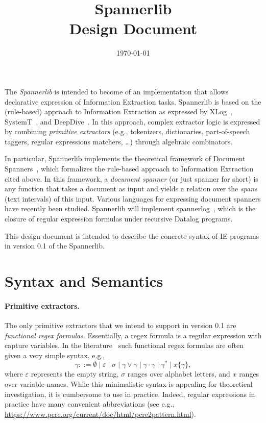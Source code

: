 \documentclass[a4paper,11pt,pdftex]{article}
\newcommand{\implname}{Spannerlib\xspace}
\newcommand{\ie}{IE\xspace}
\begin{document}
\title{\implname\\Design Document}
\date{\today}

\maketitle

The \emph{\implname} is intended to become of an implementation that allows
declarative expression of Information Extraction tasks. \implname is based on
the (rule-based) approach to Information Extraction as expressed by
XLog~\cite{SDNR07}, SystemT~\cite{CKLRRV10}, and DeepDive~\cite{DBLP:journals/cacm/ZhangRCSWW17}. In this approach, complex extractor logic is expressed by combining \emph{primitive extractors} (e.g., tokenizers, dictionaries, part-of-speech taggers, regular expressions matchers, \dots) through algebraic combinators.

In particular, \implname implements the theoretical framework of Document
Spanners~\cite{FaginKRV15}, which formalizes the rule-based approach to Information
Extraction cited above. In this framework, a \emph{document spanner} (or just
spanner for short) is any function that takes a document as input and yields a
relation over the \emph{spans} (text intervals) of this input.  Various
languages for expressing document spanners have recently been studied. \implname
will implement \textsf{spannerlog}~\cite{DBLP:conf/icdt/PeterfreundCFK19}, which is the closure of  regular expression formulas under recursive Datalog programs.

This design document is intended to describe the concrete syntax of \ie programs in version 0.1 of the \implname. 

\section{Syntax and Semantics}
\label{sec:syntax}

\paragraph*{Primitive extractors.} The only primitive extractors that we intend to support in version 0.1 are \emph{functional regex formulas}. Essentially, a regex formula is a regular expression with capture variables. In the literature~\cite{FaginKRV15} such functional regex formulas are often given a very simple syntax, e.g.,
\[ \gamma ::= \emptyset \mid \varepsilon \mid \sigma \mid \gamma \vee \gamma \mid \gamma \cdot \gamma \mid \gamma^* \mid x\{\gamma\},\]
where $\varepsilon$ represents the empty string, $\sigma$ ranges over alphabet letters, and $x$ ranges over variable names.
While this minimalistic syntax is appealing for theoretical investigation, it is
cumbersome to use in practice. Indeed, regular expressions in practice have many
convenient abbreviations (see e.g.,
\url{https://www.pcre.org/current/doc/html/pcre2pattern.html}).
\end{document}
